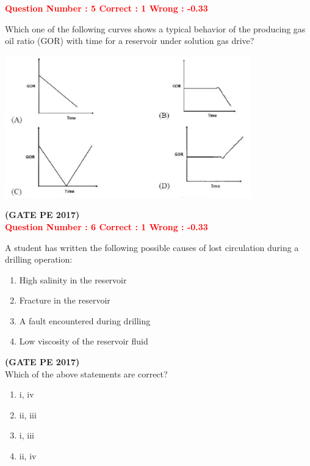 \documentclass[journal,12pt,onecolumn]{article}
\begin{document}
{\textcolor{red}{\textbf{Question Number : 5 \hfill Correct : 1  Wrong : -0.33}}

Which one of the following curves shows a typical behavior of the producing gas oil ratio (GOR) with time for a reservoir under solution gas drive?

\begin{center}
    \includegraphics[width=0.8\textwidth]{Figs/GraphQ _5.png} 
\end{center}

\hfill\textbf{(GATE PE 2017)}\\[0.6cm]


\textcolor{red}{\textbf{Question Number : 6 \hfill Correct : 1  Wrong : -0.33}}

A student has written the following possible causes of lost circulation during a drilling operation:
\begin{enumerate}[label=\roman*.]
    \item High salinity in the reservoir \\
    \item Fracture in the reservoir \\
    \item A fault encountered during drilling \\
    \item Low viscosity of the reservoir fluid
\end{enumerate}
\hfill\textbf{(GATE PE 2017)}\\[0.6cm]

Which of the above statements are correct?

\begin{enumerate}[label=(\Alph*)]
    \item i, iv
    \item ii, iii
    \item i, iii
    \item ii, iv
\end{enumerate}

}
\end{document}
